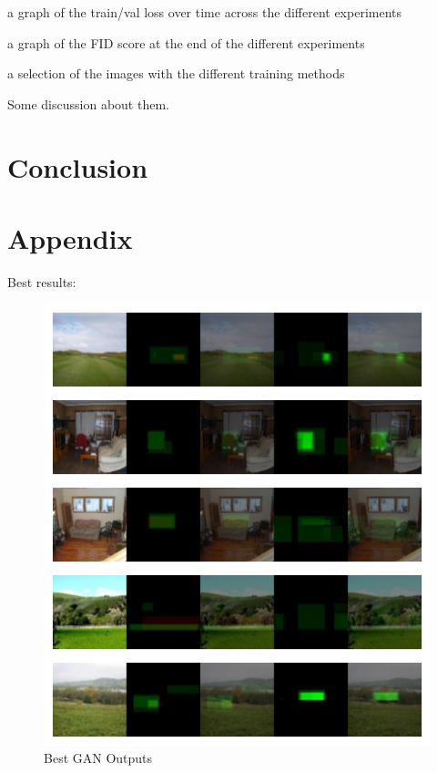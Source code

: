 \documentclass{UoYCSproject}
\begin{document}
a graph of the train/val loss over time across the different experiments


a graph of the FID score at the end of the different experiments


a selection of the images with the different training methods


Some discussion about them.


\chapter{Conclusion}


\printbibliography

\chapter{Appendix}

Best results:
\begin{figure}[ht]
    \centering
    \includegraphics[width=\linewidth]{Best GAN Outputs}
    \caption{Best GAN Outputs}
    \label{fig:GANBestOutput}
\end{figure}
\end{document}
